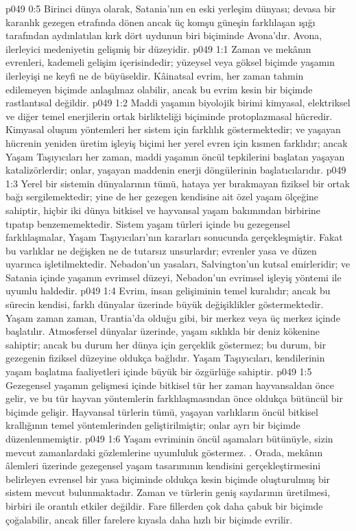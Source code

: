 \vs p049 0:5 Birinci dünya olarak, Satania’nın en eski yerleşim dünyası; devasa bir karanlık gezegen etrafında dönen ancak üç komşu güneşin farklılaşan ışığı tarafından aydınlatılan kırk dört uydunun biri biçiminde Avona’dır. Avona, ilerleyici medeniyetin gelişmiş bir düzeyidir.
\vs p049 1:1 Zaman ve mekânın evrenleri, kademeli gelişim içerisindedir; yüzeysel veya göksel biçimde yaşamın ilerleyişi ne keyfi ne de büyüseldir. Kâinatsal evrim, her zaman tahmin edilemeyen biçimde anlaşılmaz olabilir, ancak bu evrim kesin bir biçimde rastlantısal değildir.
\vs p049 1:2 Maddi yaşamın biyolojik birimi kimyasal, elektriksel ve diğer temel enerjilerin ortak birlikteliği biçiminde protoplazmasal hücredir. Kimyasal oluşum yöntemleri her sistem için farklılık göstermektedir; ve yaşayan hücrenin yeniden üretim işleyiş biçimi her yerel evren için kısmen farklıdır; ancak Yaşam Taşıyıcıları her zaman, maddi yaşamın öncül tepkilerini başlatan yaşayan katalizörlerdir; onlar, yaşayan maddenin enerji döngülerinin başlatıcılarıdır.
\vs p049 1:3 Yerel bir sistemin dünyalarının tümü, hataya yer bırakmayan fiziksel bir ortak bağı sergilemektedir; yine de her gezegen kendisine ait özel yaşam ölçeğine sahiptir, hiçbir iki dünya bitkisel ve hayvansal yaşam bakımından birbirine tıpatıp benzememektedir. Sistem yaşam türleri içinde bu gezegensel farklılaşmalar, Yaşam Taşıyıcıları’nın kararları sonucunda gerçekleşmiştir. Fakat bu varlıklar ne değişken ne de tutarsız unsurlardır; evrenler yasa ve düzen uyarınca işletilmektedir. Nebadon’un yasaları, Salvington’un kutsal emirleridir; ve Satania içinde yaşamın evrimsel düzeyi, Nebadon’un evrimsel işleyiş yöntemi ile uyumlu haldedir.
\vs p049 1:4 Evrim, insan gelişiminin temel kuralıdır; ancak bu sürecin kendisi, farklı dünyalar üzerinde büyük değişiklikler göstermektedir. Yaşam zaman zaman, Urantia’da olduğu gibi, bir merkez veya üç merkez içinde başlatılır. Atmosfersel dünyalar üzerinde, yaşam sıklıkla bir deniz kökenine sahiptir; ancak bu durum her dünya için gerçeklik göstermez; bu durum, bir gezegenin fiziksel düzeyine oldukça bağlıdır. Yaşam Taşıyıcıları, kendilerinin yaşam başlatma faaliyetleri içinde büyük bir özgürlüğe sahiptir.
\vs p049 1:5 Gezegensel yaşamın gelişmesi içinde bitkisel tür her zaman hayvansaldan önce gelir, ve bu tür hayvan yöntemlerin farklılaşmasından önce oldukça bütüncül bir biçimde gelişir. Hayvansal türlerin tümü, yaşayan varlıkların öncül bitkisel krallığının temel yöntemlerinden geliştirilmiştir; onlar ayrı bir biçimde düzenlenmemiştir.
\vs p049 1:6 Yaşam evriminin öncül aşamaları bütünüyle, sizin mevcut zamanlardaki gözlemlerine uyumluluk göstermez. . Orada, mekânın âlemleri üzerinde gezegensel yaşam tasarımının kendisini gerçekleştirmesini belirleyen evrensel bir yasa biçiminde oldukça kesin biçimde oluşturulmuş bir sistem mevcut bulunmaktadır. Zaman ve türlerin geniş sayılarının üretilmesi, birbiri ile orantılı etkiler değildir. Fare fillerden çok daha çabuk bir biçimde çoğalabilir, ancak filler farelere kıyasla daha hızlı bir biçimde evrilir.
